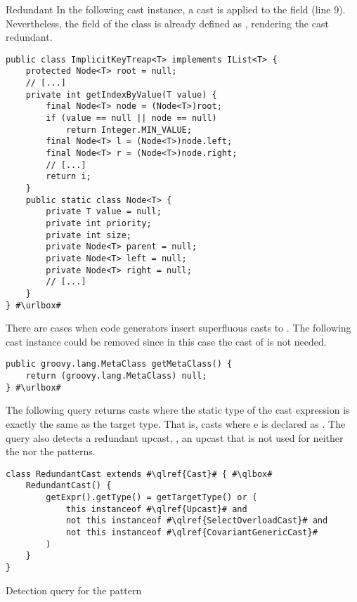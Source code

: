 \begin{pattern}{Redundant}
In the following cast instance,
a cast is applied to the  field (line 9).
Nevertheless, the  field of the  class is already defined as ,
rendering the cast redundant.

\def\urlvar{http://bit.ly/phishman3579_java_algorithms_implementation_2SGcH6w}
\begin{verbatim}
public class ImplicitKeyTreap<T> implements IList<T> {
    protected Node<T> root = null;
    // [...]
    private int getIndexByValue(T value) {
        final Node<T> node = (Node<T>)root;
        if (value == null || node == null)
            return Integer.MIN_VALUE;
        final Node<T> l = (Node<T>)node.left;
        final Node<T> r = (Node<T>)node.right;
        // [...]
        return i;
    }
    public static class Node<T> {
        private T value = null;
        private int priority;
        private int size;
        private Node<T> parent = null;
        private Node<T> left = null;
        private Node<T> right = null;
        // [...]
    }
} #\urlbox#
\end{verbatim}

There are cases when code generators insert superfluous casts to .
The following cast instance could be removed since in this case the cast of  is not needed.

\def\urlvar{http://bit.ly/togglz_togglz_2SGncXB}
\begin{verbatim}
public groovy.lang.MetaClass getMetaClass() {
    return (groovy.lang.MetaClass) null;
} #\urlbox#
\end{verbatim}


\detection{}
The following query returns casts where the static type of the cast expression is exactly the same as the target type.
That is, casts  where e is declared as .
The query also detects a redundant upcast, \ie{},
an upcast that is not used for neither the  nor the  patterns.

\begin{listing}
\begin{verbatim}
class RedundantCast extends #\qlref{Cast}# { #\qlbox#
	RedundantCast() {
		getExpr().getType() = getTargetType() or (
			this instanceof #\qlref{Upcast}# and
			not this instanceof #\qlref{SelectOverloadCast}# and
			not this instanceof #\qlref{CovariantGenericCast}#
		)
	}
}
\end{verbatim}
\caption{Detection query for the \thisp{} pattern}
\end{listing}



\end{pattern}
